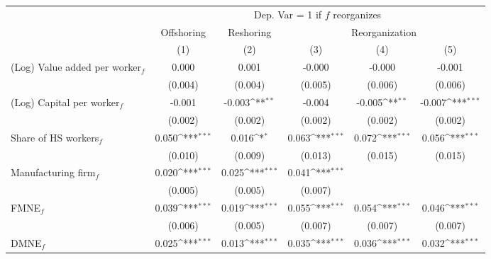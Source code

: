 \begin{table}[htbp] \scriptsize \centering
\def\sym#1{\ifmmode^{#1}\else\(^{#1}\)\fi}
\renewcommand{\arraystretch}{1}
\begin{tabular}{l*{5}{c}}
\toprule
&\multicolumn{5}{c}{Dep. Var = 1 if $ f $ reorganizes} \\
\cmidrule(lr){2-6}
                &\multicolumn{1}{c}{Offshoring}&\multicolumn{1}{c}{Reshoring}&\multicolumn{3}{c}{Reorganization}                      \\\cmidrule(lr){2-2}\cmidrule(lr){3-3}\cmidrule(lr){4-6}
                &\multicolumn{1}{c}{(1)}         &\multicolumn{1}{c}{(2)}         &\multicolumn{1}{c}{(3)}         &\multicolumn{1}{c}{(4)}         &\multicolumn{1}{c}{(5)}         \\
\midrule
(Log) Value added per worker$ _f$&    0.000         &    0.001         &   -0.000         &   -0.000         &   -0.001         \\
                &  (0.004)         &  (0.004)         &  (0.005)         &  (0.006)         &  (0.006)         \\
\addlinespace
(Log) Capital per worker$ _f$&   -0.001         &   -0.003\sym{**} &   -0.004         &   -0.005\sym{**} &   -0.007\sym{***}\\
                &  (0.002)         &  (0.002)         &  (0.002)         &  (0.002)         &  (0.002)         \\
\addlinespace
Share of HS workers$ _f$&    0.050\sym{***}&    0.016\sym{*}  &    0.063\sym{***}&    0.072\sym{***}&    0.056\sym{***}\\
                &  (0.010)         &  (0.009)         &  (0.013)         &  (0.015)         &  (0.015)         \\
\addlinespace
Manufacturing firm$ _f$&    0.020\sym{***}&    0.025\sym{***}&    0.041\sym{***}&                  &                  \\
                &  (0.005)         &  (0.005)         &  (0.007)         &                  &                  \\
\addlinespace
FMNE$ _f$       &    0.039\sym{***}&    0.019\sym{***}&    0.055\sym{***}&    0.054\sym{***}&    0.046\sym{***}\\
                &  (0.006)         &  (0.005)         &  (0.007)         &  (0.007)         &  (0.007)         \\
\addlinespace
DMNE$ _f$       &    0.025\sym{***}&    0.013\sym{***}&    0.035\sym{***}&    0.036\sym{***}&    0.032\sym{***}\\

\end{tabular}
\end{table}
